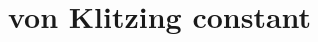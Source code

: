 \hypertarget{group___conventionalvon_klitzing_constant}{}\section{von Klitzing constant}
\label{group___conventionalvon_klitzing_constant}
